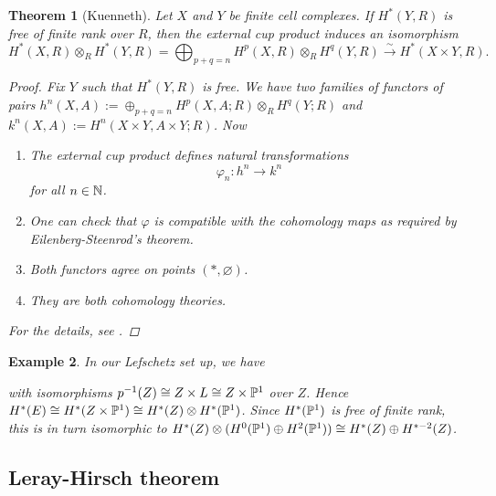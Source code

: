\documentclass[A4paper, british]{amsart}
\theoremstyle{darkgreentheorem}
\newtheorem{thm}{Theorem}[section]
\theoremstyle{darkbluedefinition}
\theoremstyle{darkredexample}
\newtheorem{exa}[thm]{Example}
\theoremstyle{remark}
\newcommand{\1}{\mathbbm{1}}
\newcommand{\ot}{\otimes}
\newcommand{\op}{\oplus}
\begin{document}
\begin{thm}[Kuenneth]
    Let $X$ and $Y$ be finite cell complexes.
    If $H^{*}(Y,R)$ is free of finite rank over $R$, then the external cup product induces an isomorphism
    \[ H^{*}(X,R)\ot_{R}H^{*}(Y,R)=\bigoplus_{p+q=n}H^{p}(X,R)\ot_{R} H^{q}(Y,R)\xrightarrow{\sim} H^{*}(X\times Y,R). \]
    \begin{proof}
	Fix $Y$ such that $H^{*}(Y,R)$ is free.
	We have two families of functors of pairs $h^{n}(X,A):=\op_{p+q=n} H^{p}(X,A;R)\ot_{R}H^{q}(Y;R)$ and $k^{n}(X,A):=H^{n}(X\times Y,A\times Y;R)$.
	Now
	\begin{enumerate}
	    \item The external cup product defines natural transformations
		\[ \varphi_{n}\colon h^{n}\to k^{n} \]
		for all $n\in \N$.
	    \item One can check that $\varphi$ is compatible with the cohomology maps as required by Eilenberg-Steenrod's theorem.
	    \item Both functors agree on points $(*,\varnothing)$.
	    \item They are both cohomology theories.
	\end{enumerate}
	For the details, see \cite[Theorem 3.16]{hat01}.
    \end{proof}
\end{thm}

\begin{exa}
    In our Lefschetz set up, we have
    \begin{center}
    \end{center}
    with isomorphisms $p^{-1}(Z)\cong Z\times L\cong Z\times \P^{1}$ over $Z$.
    Hence $H^{*}(E)\cong H^{*}(Z\times \P^{1})\cong H^{*}(Z)\ot H^{*}(\P^{1})$.
    Since $H^{*}(\P^{1})$ is free of finite rank, this is in turn isomorphic to $H^{*}(Z)\ot (H^{0}(\P^{1})\op H^{2}(\P^{1}))\cong H^{*}(Z)\op H^{*-2}(Z)$.
\end{exa}

\subsection{Leray-Hirsch theorem}
\end{document}

